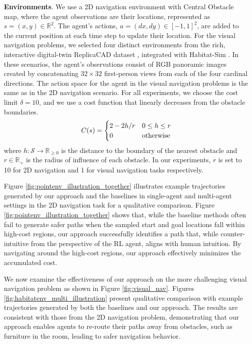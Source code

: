 \documentclass[letterpaper, 10 pt, conference]{IEEEConference}
\begin{document}
\textbf{Environments}. We use a 2D navigation environment with Central Obstacle map, where the agent observations are their locations, represented as $s = (x, y) \in \mathbb{R}^2$. The agent's actions, $a = (dx, dy) \in [-1, 1]^2$, are added to the current position at each time step to update their location. For the visual navigation problems, we selected four distinct environments from the rich, interactive digital-twin ReplicaCAD dataset \cite{replica19arxiv}, integrated with Habitat-Sim \cite{szot2021habitat,habitat19iccv}. In these scenarios, the agent's observations consist of RGB panoramic images created by concatenating $32 \times 32$ first-person views from each of the four cardinal directions. The action space for the agent in the visual navigation problems is the same as in the 2D navigation scenario. For all experiments, we choose the cost limit $\delta=10$, and we use a cost function that linearly decreases from the obstacle boundaries.
\begin{equation}
    C(s) = 
        \begin{cases}
            2-2h/r & 0 \le h \le r \\
            0 & \textnormal{otherwise}
        \end{cases}
    \label{eq:cost_f}
\end{equation}
where $h: \mathcal{S} \rightarrow \mathbb{R}_{\ge0}$ is the distance to the boundary of the nearest obstacle and $r \in \mathbb{R}_{+}$ is the radius of influence of each obstacle. In our experiments, $r$ is set to 10 for 2D navigation and 1 for visual navigation tasks respectively.

Figure \ref{fig:pointenv_illustration_together} illustrates example trajectories generated by our approach and the baselines in single-agent and multi-agent settings in the 2D navigation task for a qualitative comparison. Figure \ref{fig:pointenv_illustration_together} shows that, while the baseline methods often fail to generate safer paths when the sampled start and goal locations fall within high-cost regions, our approach successfully identifies a path that, while counter-intuitive from the perspective of the RL agent, aligns with human intuition. By navigating around the high-cost regions, our approach effectively minimizes the accumulated cost.

We now examine the effectiveness of our approach on the more challenging visual navigation problem as shown in Figure \ref{fig:visual_nav}. Figures \ref{fig:habitatenv_multi_illustration} present qualitative comparison with example trajectories generated by both the baselines and our approach. The results are consistent with those from the 2D navigation problem, demonstrating that our approach enables agents to re-route their paths away from obstacles, such as furniture in the room, leading to safer navigation behavior.
\end{document}
